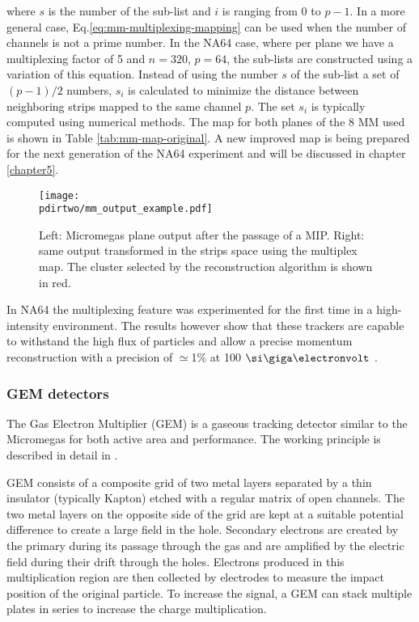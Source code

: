 where $s$ is the number of the sub-list and $i$ is ranging from 0 to $p-1$. In a more general case, Eq.\ref{eq:mm-multiplexing-mapping} can be used when the number of channels is not a prime number. In the NA64 case, where per plane we have a multiplexing factor of 5 and $n=320$, $p=64$, the sub-lists are constructed using a variation of this equation. Instead of using the number $s$ of the sub-list a set of $(p-1)/2$ numbers, $s_i$ is calculated to minimize the distance between neighboring strips mapped to the same channel $p$. The set $s_i$ is typically computed using numerical methods. The map for both planes of the 8 MM used is shown in Table \ref{tab:mm-map-original}. A new improved map is being prepared for the next generation of the NA64 experiment and will be discussed in chapter \ref{chapter5}.

\begin{figure}[bth!]
  \centering
  \texttt{[image: \\pdirtwo/mm\_output\_example.pdf]}
\caption[Example of the readout of a multiplexing detector]{Left: Micromegas plane output after the passage of a MIP. Right: same output transformed in the strips space using the multiplex map. The cluster selected by the reconstruction algorithm is shown in red.}
\label{fig:multiplexing-example}
\end{figure}

In NA64 the multiplexing feature was experimented for the first time in a high-intensity environment. The results however show that these trackers are capable to withstand the high flux of particles and allow a precise momentum reconstruction with a precision of $\simeq$1\% at 100 $\gev$ \cite{Banerjee:2017mdu}.

\subsubsection{GEM detectors}
\label{ch2:sec:gem}
The Gas Electron Multiplier (GEM) is a gaseous tracking detector similar to the Micromegas for both active area and performance. The working principle is described in detail in \cite{gem,SAULI20162,ABBON2007455}.

GEM consists of a composite grid of two metal layers separated by a thin insulator (typically Kapton) etched with a regular matrix of open channels. The two metal layers on the opposite side of the grid are kept at a suitable potential difference to create a large field in the hole. Secondary electrons are created by the primary during its passage through the gas and are amplified by the electric field during their drift through the holes. Electrons produced in this multiplication region are then collected by electrodes to measure the impact position of the original particle. To increase the signal, a GEM can stack multiple plates in series to increase the charge multiplication.

